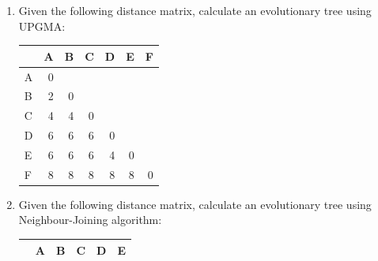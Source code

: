 \documentclass[11pt,runningheads,a4paper]{article}
\begin{document}
\begin{enumerate}
\begin{figure}[h]
    \end{figure}
  \item Given the following distance matrix, calculate an evolutionary tree using UPGMA:
  \nopagebreak
    \begin{table}[H]
      \centering
      \begin{tabular}{|l|r|r|r|l|l|l|}
        \hline
        & \multicolumn{1}{l|}{A} & \multicolumn{1}{l|}{B} & \multicolumn{1}{l|}{C} & D & E & F \\ \hline
        A & 0 & \multicolumn{1}{l|}{} & \multicolumn{1}{l|}{} &  &  &  \\ \hline
        B & 2 & 0 & \multicolumn{1}{l|}{} &  &  &  \\ \hline
        C & 4 & 4 & 0 &  &  &  \\ \hline
        D & 6 & 6 & 6 & \multicolumn{1}{r|}{0} &  &  \\ \hline
        E & 6 & 6 & 6 & \multicolumn{1}{r|}{4} & \multicolumn{1}{r|}{0} &  \\ \hline
        F & 8 & 8 & 8 & \multicolumn{1}{r|}{8} & \multicolumn{1}{r|}{8} & \multicolumn{1}{r|}{0} \\ \hline
      \end{tabular}
      \label{}
    \end{table}
  \item  Given the following distance matrix, calculate an evolutionary tree using Neighbour-Joining algorithm:
  \nopagebreak
    \begin{table}[H]
      \centering
      \begin{tabular}{|l|r|r|r|l|l|}
        \hline
        & \multicolumn{1}{l|}{A} & \multicolumn{1}{l|}{B} & \multicolumn{1}{l|}{C} & D & E \\ \hline

\end{tabular}
\end{table}
\end{enumerate}
\end{document}

